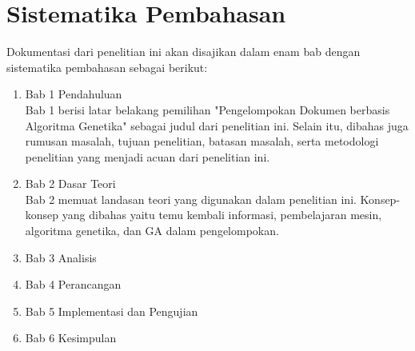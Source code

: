 \section{Sistematika Pembahasan}
\label{sec:sispem}
Dokumentasi dari penelitian ini akan disajikan dalam enam bab dengan sistematika pembahasan sebagai berikut:
\begin{enumerate}
	\item Bab 1 Pendahuluan\\
		Bab 1 berisi latar belakang pemilihan "Pengelompokan Dokumen berbasis Algoritma Genetika" sebagai judul dari penelitian ini. Selain itu, dibahas juga rumusan masalah, tujuan penelitian, batasan masalah, serta metodologi penelitian yang menjadi acuan dari penelitian ini.
	\item Bab 2 Dasar Teori\\
		Bab 2 memuat landasan teori yang digunakan dalam penelitian ini. Konsep-konsep yang dibahas yaitu temu kembali informasi, pembelajaran mesin, algoritma genetika, dan GA dalam pengelompokan.
	\item Bab 3 Analisis\\		
	\item Bab 4 Perancangan\\
	\item Bab 5 Implementasi dan Pengujian\\
	\item Bab 6 Kesimpulan\\
\end{enumerate}